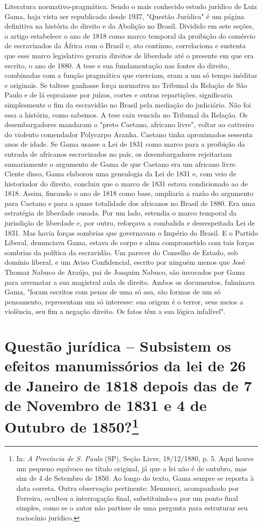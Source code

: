 {\small\noindent
Literatura normativo-pragmática. Sendo o mais conhecido estudo
jurídico de Luiz Gama, haja vista ser republicado desde 1937, "Questão
Jurídica" é um página definitiva na história do direito e da Abolição no
Brasil. Dividido em sete seções, o artigo estabelece o ano de 1818 como
marco temporal da proibição do comércio de escravizados da África com o
Brasil e, ato contínuo, correlaciona e sustenta que esse marco
legislativo geraria direitos de liberdade até o presente em que era
escrito, o ano de 1880. A tese e sua fundamentação nas fontes do
direito, combinadas com a função pragmática que exerciam, eram a um só
tempo inéditas e originais. Se taltese ganhasse força normativa no
Tribunal da Relação de São Paulo e de lá espraiasse por juízos, cortes e
outras repartições, significaria simplesmente o fim da escravidão no
Brasil pela mediação do judiciário. Não foi essa a história, como
sabemos. A tese caiu vencida no Tribunal da Relação. Os desembargadores
mandaram o "preto Caetano, africano livre", voltar ao cativeiro do
violento comendador Polycarpo Aranha. Caetano tinha aproximados sessenta
anos de idade. Se Gama usasse a Lei de 1831 como marco para a proibição
da entrada de africanos escravizados no país, os desembargadores
rejeitariam sumariamente o argumento de Gama de que Caetano era um
africano livre. Ciente disso, Gama elaborou uma genealogia da Lei de
1831 e, com veio de historiador do direito, concluiu que o marco de 1831
estava condicionado ao de 1818. Assim, fincando o ano de 1818 como base,
ampliaria a razão do argumento para Caetano e para a quase totalidade
dos africanos no Brasil de 1880. Era uma estratégia de liberdade ousada.
Por um lado, estendia o marco temporal da jurisdição de liberdade e, por
outro, reforçava a combalida e desrespeitada Lei de 1831. Mas havia
forças sombrias que governavam o Império do Brasil. E o Partido Liberal,
denunciava Gama, estava de corpo e alma comprometido com tais forças
sombrias da política da escravidão. Um parecer do Conselho de Estado,
sob domínio liberal, e um Aviso Confidencial, escrito por ninguém menos
que José Thomaz Nabuco de Araújo, pai de Joaquim Nabuco, são invocados
por Gama para arrematar a sua magistral aula de direito. Ambos os
documentos, fulminava Gama, "foram escritos com penas de uma só asa, são
formas de um só pensamento, representam um só interesse: sua origem é o
terror, seus meios a violência, seu fim a negação direito. Os fatos têm
a sua lógica infalível". }

\chapter{Questão jurídica -- Subsistem os efeitos manumissórios da
lei de 26 de Janeiro de 1818 depois das de 7 de Novembro de 1831 e 4 de
Outubro de 1850?\footnote[*]{In: \emph{A Província de S. Paulo} (SP),
  Seção Livre, 18/12/1880, p. 5. Aqui houve um pequeno equívoco no
  título original, já que a lei não é de outubro, mas sim de 4 de
  Setembro de 1850. Ao longo do texto, Gama sempre se reporta à data
  correta. Outra observação pertinente: Mennucci, acompanhado por
  Ferreira, ocultou a interrogação final, substituindo-a por um ponto
  final simples, como se o autor não partisse de uma pergunta para
  estruturar seu raciocínio jurídico.}}



